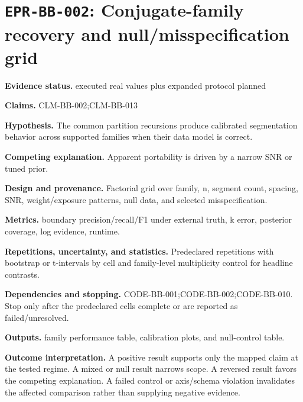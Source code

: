 \section[\texttt{EPR-BB-002}]{\texttt{EPR-BB-002}: Conjugate-family recovery and null/misspecification grid}
\textbf{Evidence status.} executed real values plus expanded protocol planned\par
\textbf{Claims.} CLM-BB-002;CLM-BB-013\par
\textbf{Hypothesis.} The common partition recursions produce calibrated segmentation behavior across supported families when their data model is correct.\par
\textbf{Competing explanation.} Apparent portability is driven by a narrow SNR or tuned prior.\par
\textbf{Design and provenance.} Factorial grid over family, n, segment count, spacing, SNR, weight/exposure patterns, null data, and selected misspecification.\par
\textbf{Metrics.} boundary precision/recall/F1 under external truth, k error, posterior coverage, log evidence, runtime.\par
\textbf{Repetitions, uncertainty, and statistics.} Predeclared repetitions with bootstrap or t-intervals by cell and family-level multiplicity control for headline contrasts.\par
\textbf{Dependencies and stopping.} CODE-BB-001;CODE-BB-002;CODE-BB-010. Stop only after the predeclared cells complete or are reported as failed/unresolved.\par
\textbf{Outputs.} family performance table, calibration plots, and null-control table.\par
\textbf{Outcome interpretation.} A positive result supports only the mapped claim at the tested regime. A mixed or null result narrows scope. A reversed result favors the competing explanation. A failed control or axis/schema violation invalidates the affected comparison rather than supplying negative evidence.

